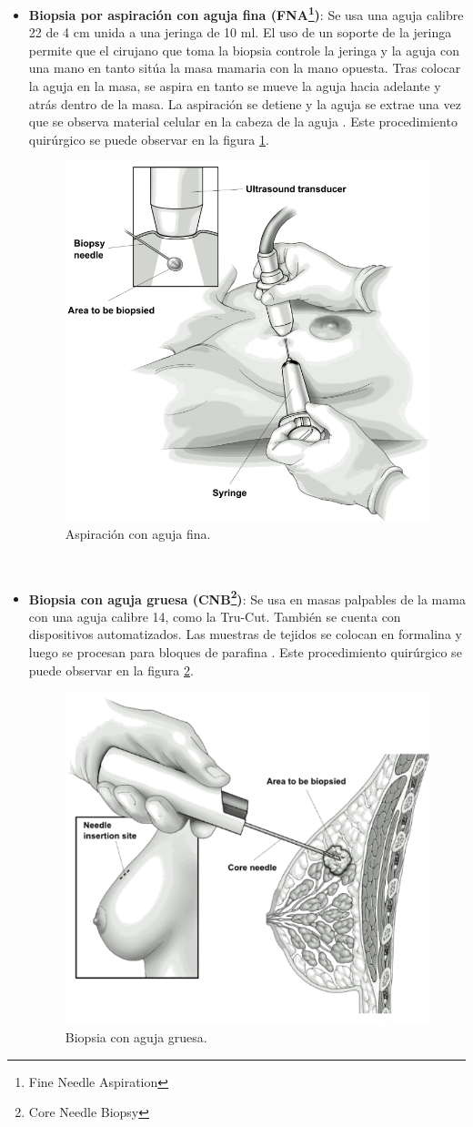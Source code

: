 \begin{itemize}[label=\HandRight]
	\item \textbf{Biopsia por aspiración con aguja fina (FNA\footnote{Fine Needle Aspiration})}: Se usa una aguja calibre 22 de 4 cm unida a una jeringa de 10 ml. El uso de un soporte de la jeringa permite que el cirujano que toma la biopsia controle la jeringa y la aguja con una mano en tanto sitúa la masa mamaria con la mano opuesta. Tras colocar la aguja en la masa, se aspira en tanto se mueve la aguja hacia adelante y atrás dentro de la masa. La aspiración se detiene y la aguja se extrae una vez que se observa material celular en la cabeza de la aguja \cite{Brunicardi2010}. Este procedimiento quirúrgico se puede observar en la figura \ref{FNB}.
	 \begin{figure}[!htb]
	 	\centering
	 	\includegraphics[width=0.5
	 	\linewidth]{IMAGENES/FNB}
	 	\caption{Aspiración con aguja fina\cite{FNB}.}
	 	\label{FNB}
	 \end{figure}	
	 \\
	
	\item \textbf{Biopsia con aguja gruesa (CNB\footnote{Core Needle Biopsy})}: Se usa en masas palpables de la mama  con una aguja calibre 14, como la Tru-Cut. También se cuenta con dispositivos automatizados. Las muestras de tejidos se colocan en formalina y luego se procesan para bloques de parafina \cite{Brunicardi2010}. Este procedimiento quirúrgico se puede observar en la figura \ref{CNB}.
	\begin{figure}[!htb]
		\centering
		\includegraphics[width=0.5
		\linewidth]{IMAGENES/CNB}
		\caption{Biopsia con aguja gruesa\cite{CNB}.}
		\label{CNB}
	\end{figure}	
\end{itemize}

